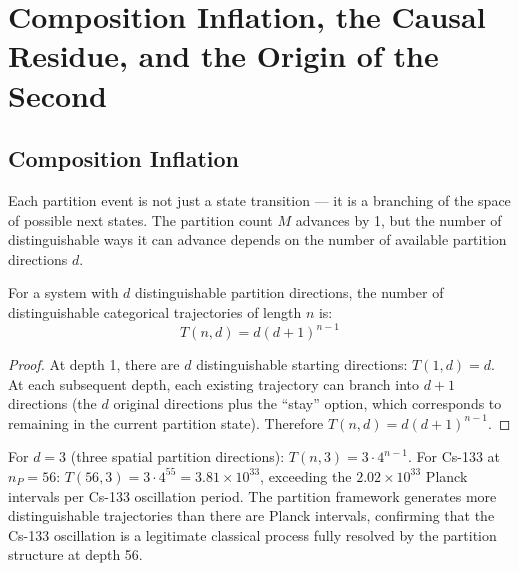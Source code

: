 
\section{Composition Inflation, the Causal Residue, and the Origin of the
Second}
\label{sec:composition}

\subsection{Composition Inflation}
\label{subsec:comp_inflation}

Each partition event is not just a state transition --- it is a branching of the
space of possible next states. The partition count $M$ advances by 1, but the
number of distinguishable ways it can advance depends on the number of available
partition directions $d$.

\begin{theorem}
\label{thm:comp_inflation}
For a system with $d$ distinguishable partition directions, the number of
distinguishable categorical trajectories of length $n$ is:
\begin{equation}
    T(n,d) = d(d+1)^{n-1}
    \label{eq:comp_inflation}
\end{equation}
\end{theorem}

\begin{proof}
At depth 1, there are $d$ distinguishable starting directions: $T(1,d) = d$.
At each subsequent depth, each existing trajectory can branch into $d+1$
directions (the $d$ original directions plus the ``stay'' option, which
corresponds to remaining in the current partition state). Therefore
$T(n,d) = d(d+1)^{n-1}$.
\end{proof}

For $d=3$ (three spatial partition directions): $T(n,3) = 3 \cdot 4^{n-1}$.
For Cs-133 at $n_P = 56$: $T(56,3) = 3 \cdot 4^{55} = 3.81 \times 10^{33}$,
exceeding the $2.02 \times 10^{33}$ Planck intervals per Cs-133 oscillation
period. The partition framework generates more distinguishable trajectories than
there are Planck intervals, confirming that the Cs-133 oscillation is a
legitimate classical process fully resolved by the partition structure at
depth 56.

